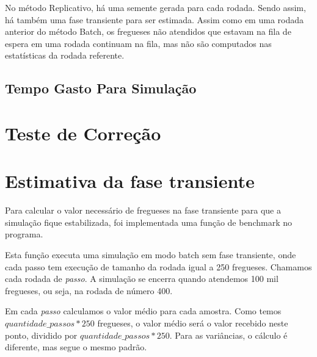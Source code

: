 \documentclass[a4paper,10pt]{article}
\begin{document}
    No método Replicativo, há uma semente gerada para cada rodada. Sendo assim, há também uma fase transiente para ser estimada. Assim como em uma rodada anterior do método Batch, os fregueses não atendidos que estavam na fila de espera em uma rodada continuam na fila, mas não são computados nas estatísticas da rodada referente.


\subsection{Tempo Gasto Para Simulação}

\pagebreak

\section{Teste de Correção}
\pagebreak

\section{Estimativa da fase transiente}
    Para calcular o valor necessário de fregueses na fase transiente para que a simulação fique estabilizada, foi implementada uma função de benchmark no programa.

    Esta função executa uma simulação em modo batch sem fase transiente, onde cada passo tem execução de tamanho da rodada igual a 250 fregueses. Chamamos cada rodada de \emph{passo}. A simulação se encerra quando atendemos 100 mil fregueses, ou seja, na rodada de número 400.

    Em cada \emph{passo} calculamos o valor médio para cada amostra. Como temos $quantidade\_passos * 250$ fregueses, o valor médio será o valor recebido neste ponto, dividido por $quantidade\_passos * 250$. Para as variâncias, o cálculo é diferente, mas segue o mesmo padrão.
\end{document}
